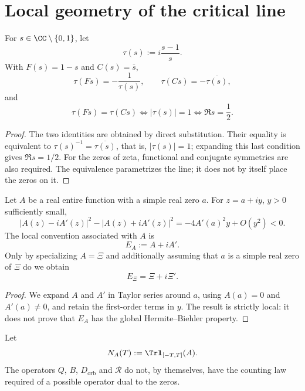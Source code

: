 \section{Local geometry of the critical line}

\begin{lemma}
\label{pf84:RH-01}
For \(s\in\CC\setminus\{0,1\}\), let
\[
 \tau(s):=i\frac{s-1}{s}.
\]
With \(F(s)=1-s\) and \(C(s)=\overline s\),
\[
 \tau(Fs)=-\frac1{\tau(s)},
 \qquad
 \tau(Cs)=-\overline{\tau(s)},
\]
and
\[
 \tau(Fs)=\tau(Cs)
 \iff |\tau(s)|=1
 \iff \Re s=\frac12.
\]
\end{lemma}

\begin{proof}
The two identities are obtained by direct substitution. Their equality
is equivalent to \(\tau(s)^{-1}=\overline{\tau(s)}\), that is,
\(|\tau(s)|=1\); expanding this last condition gives
\(\Re s=1/2\). For the zeros of zeta, functional and conjugate symmetries
are also required. The equivalence parametrizes the line; it does not by
itself place the zeros on it.
\end{proof}

\begin{lemma}
\label{pf84:RH-04}
Let \(A\) be a real entire function with a simple real zero \(a\). For
\(z=a+iy\), \(y>0\) sufficiently small,
\[
|A(z)-iA'(z)|^2-|A(z)+iA'(z)|^2
 =-4A'(a)^2y+O(y^2)<0.
\]
The local convention associated with \(A\) is
\[
 E_A:=A+iA'.
\]
Only by specializing \(A=\Xi\) and additionally assuming that \(a\) is a simple real
zero of \(\Xi\) do we obtain
\[
 E_\Xi=\Xi+i\Xi'.
\]
\end{lemma}

\begin{proof}
We expand \(A\) and \(A'\) in Taylor series around \(a\), using
\(A(a)=0\) and \(A'(a)\ne0\), and retain the first-order terms in
\(y\). The result is strictly local: it does not prove that \(E_A\) has the
global Hermite--Biehler property.
\end{proof}

\begin{proposition}
\label{pf84:E14}
Let
\[
 N_A(T):=\Tr\mathbf1_{[-T,T]}(A).
\]
The operators \(Q\), \(B\), \(D_{\mathrm{orb}}\) and \(\mathcal R\) do not,
by themselves, have the counting law required of a possible operator dual
to the zeros.
\end{proposition}

